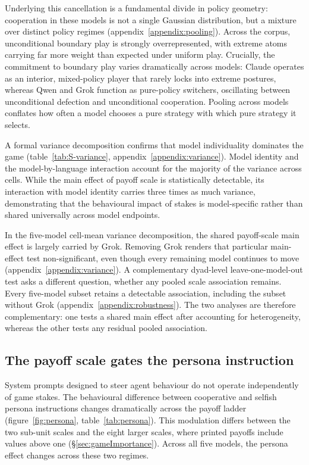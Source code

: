 \documentclass[11pt,a4paper]{article}
\begin{document}
Underlying this cancellation is a fundamental divide in policy geometry:
cooperation in these models is not a single Gaussian distribution, but a mixture
over distinct policy regimes (appendix~\ref{appendix:pooling}). Across the corpus,
unconditional boundary play is strongly overrepresented, with extreme atoms
carrying far more weight than expected under uniform play. Crucially, the commitment to boundary
play varies dramatically across models: Claude operates as an interior,
mixed-policy player that rarely locks into extreme postures, whereas Qwen and
Grok function as pure-policy switchers, oscillating between unconditional
defection and unconditional cooperation. Pooling across models conflates how
often a model chooses a pure strategy with which pure strategy it selects.

A formal variance decomposition confirms that model individuality dominates
the game (table~\ref{tab:S-variance}, appendix~\ref{appendix:variance}). Model
identity and the model-by-language interaction account for the majority of the
variance across cells. While the main effect of payoff scale is statistically
detectable, its interaction with model identity carries three times as much
variance, demonstrating that the behavioural impact of stakes is model-specific
rather than shared universally across model endpoints.

In the five-model cell-mean variance decomposition, the shared payoff-scale
main effect is largely carried by Grok. Removing Grok renders that particular
main-effect test non-significant, even though every remaining model continues
to move (appendix~\ref{appendix:variance}). A complementary dyad-level
leave-one-model-out test asks a different question, whether any pooled scale
association remains. Every five-model subset retains a detectable association,
including the subset without Grok (appendix~\ref{appendix:robustness}). The two
analyses are therefore complementary: one tests a shared main effect after
accounting for heterogeneity, whereas the other tests any residual pooled
association.

\subsection{The payoff scale gates the persona instruction}\label{sec:persona}

System prompts designed to steer agent behaviour do not operate independently of
game stakes. The behavioural difference between cooperative and selfish persona
instructions changes dramatically across the payoff ladder (figure~\ref{fig:persona},
table~\ref{tab:persona}). This modulation differs between the two sub-unit
scales and the eight larger scales, where printed payoffs include values above
one (\S\ref{sec:gameImportance}). Across all five models, the persona effect
changes across these two regimes.
\end{document}
